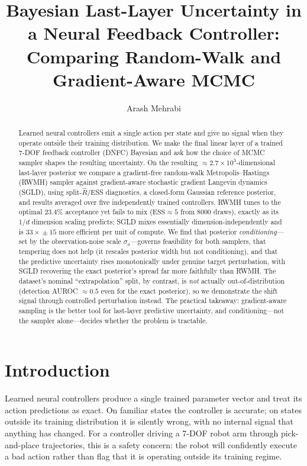 \documentclass[11pt]{article}
\title{Bayesian Last-Layer Uncertainty in a Neural Feedback Controller:\\
Comparing Random-Walk and Gradient-Aware MCMC}
\author{Arash Mehrabi}
\date{}
\begin{document}
\maketitle

\begin{abstract}
Learned neural controllers emit a single action per state and give no signal when they operate
outside their training distribution. We make the final linear layer of a trained 7-DOF feedback
controller (DNFC) Bayesian and ask how the choice of MCMC sampler shapes the resulting uncertainty.
On the resulting $\approx\!2.7\times10^{3}$-dimensional last-layer posterior we compare a gradient-free
random-walk Metropolis--Hastings (RWMH) sampler against gradient-aware stochastic gradient Langevin
dynamics (SGLD), using split-$\hat R$/ESS diagnostics, a closed-form Gaussian reference posterior, and
results averaged over five independently trained controllers. RWMH tunes to the optimal $23.4\%$
acceptance yet fails to mix ($\mathrm{ESS}\approx5$ from $8000$ draws), exactly as its $1/d$ dimension
scaling predicts; SGLD mixes essentially dimension-independently and is $33\times\!\pm\!15$ more
efficient per unit of compute. We find that posterior \emph{conditioning}---set by the observation-noise
scale $\sigma_a$---governs feasibility for both samplers, that tempering does not help (it rescales
posterior width but not conditioning), and that the predictive uncertainty rises monotonically under
genuine target perturbation, with SGLD recovering the exact posterior's spread far more faithfully than
RWMH. The dataset's nominal ``extrapolation'' split, by contrast, is \emph{not} actually
out-of-distribution (detection AUROC $\approx 0.5$ even for the exact posterior), so we demonstrate the
shift signal through controlled perturbation instead. The practical takeaway: gradient-aware sampling is
the better tool for last-layer predictive uncertainty, and conditioning---not the sampler alone---decides
whether the problem is tractable.
\end{abstract}

\section{Introduction}
Learned neural controllers produce a single trained parameter vector and treat its action predictions as
exact. On familiar states the controller is accurate; on states outside its training distribution it is
silently wrong, with no internal signal that anything has changed. For a controller driving a 7-DOF robot
arm through pick-and-place trajectories, this is a safety concern: the robot will confidently execute a
bad action rather than flag that it is operating outside its training regime.
\end{document}
